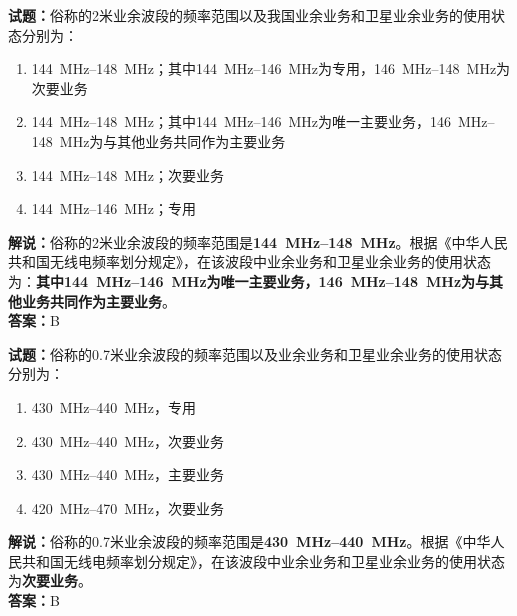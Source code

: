 \documentclass{ctexbook}
\begin{document}
\vspace{\baselineskip}

\noindent\textbf{试题：}俗称的2米业余波段的频率范围以及我国业余业务和卫星业余业务的使用状态分别为：
\begin{enumerate}[leftmargin=3em]
  \item \qtyrange[range-phrase=--]{144}{148}{\MHz}；其中\qtyrange[range-phrase=--]{144}{146}{\MHz}为专用，\qtyrange[range-phrase=--]{146}{148}{\MHz}为次要业务
  \item \qtyrange[range-phrase=--]{144}{148}{\MHz}；其中\qtyrange[range-phrase=--]{144}{146}{\MHz}为唯一主要业务，\qtyrange[range-phrase=--]{146}{148}{\MHz}为与其他业务共同作为主要业务
  \item \qtyrange[range-phrase=--]{144}{148}{\MHz}；次要业务
  \item \qtyrange[range-phrase=--]{144}{146}{\MHz}；专用
\end{enumerate}
\noindent\textbf{解说：}俗称的2米业余波段的频率范围是\textbf{\qtyrange[range-phrase=--]{144}{148}{\MHz}}。根据《中华人民共和国无线电频率划分规定》，在该波段中业余业务和卫星业余业务的使用状态为：\textbf{其中\qtyrange[range-phrase=--]{144}{146}{\MHz}为唯一主要业务，\qtyrange[range-phrase=--]{146}{148}{\MHz}为与其他业务共同作为主要业务}。\\\noindent\textbf{答案：}B

\vspace{\baselineskip}

\noindent\textbf{试题：}俗称的0.7米业余波段的频率范围以及业余业务和卫星业余业务的使用状态分别为：
\begin{enumerate}[leftmargin=3em]
  \item \qtyrange[range-phrase=--]{430}{440}{\MHz}，专用
  \item \qtyrange[range-phrase=--]{430}{440}{\MHz}，次要业务
  \item \qtyrange[range-phrase=--]{430}{440}{\MHz}，主要业务
  \item \qtyrange[range-phrase=--]{420}{470}{\MHz}，次要业务
\end{enumerate}
\noindent\textbf{解说：}俗称的0.7米业余波段的频率范围是\textbf{\qtyrange[range-phrase=--]{430}{440}{\MHz}}。根据《中华人民共和国无线电频率划分规定》，在该波段中业余业务和卫星业余业务的使用状态为\textbf{次要业务}。\\\noindent\textbf{答案：}B

\vspace{\baselineskip}
\end{document}
